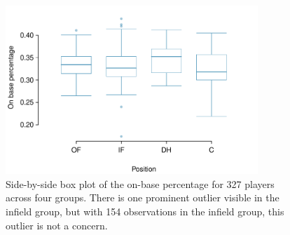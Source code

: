 \begin{figure}
\centering
\includegraphics[width=0.85\textwidth]{05/figures/mlbANOVA/mlbANOVABoxPlot}
\caption{Side-by-side box plot of the on-base percentage for 327 players across four groups. There is one prominent outlier visible in the infield group, but with 154 observations in the infield group, this outlier is not a concern.}
\label{mlbANOVABoxPlot}
\end{figure}

